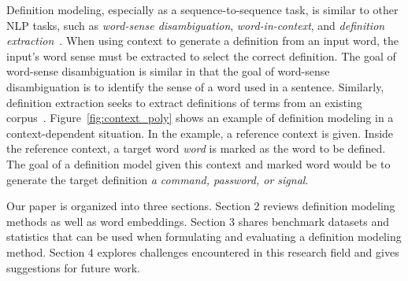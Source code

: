 Definition modeling, especially as a sequence-to-sequence task, is similar to other NLP tasks, such as \textit{word-sense disambiguation}, \textit{word-in-context}, and \textit{definition extraction}~\cite{bevilacqua_generationary_2020, huang_cdm_2021}. When using context to generate a definition from an input word, the input's word sense must be extracted to select the correct definition. The goal of word-sense disambiguation is similar in that the goal of word-sense disambiguation is to identify the sense of a word used in a sentence. Similarly, definition extraction seeks to extract definitions of terms from an existing corpus~\cite{huang_cdm_2021}. Figure~\ref{fig:context_poly} shows an example of definition modeling in a context-dependent situation. In the example, a reference context is given. Inside the reference context, a target word
\textit{word} is marked as the word to be defined. The goal of a definition model given this context and marked word would be to generate the target definition \textit{a command, password, or signal}.

Our paper is organized into three sections. Section 2 reviews definition modeling methods as well as word embeddings. Section 3 shares benchmark datasets
and statistics that can be used when formulating and evaluating a definition modeling method. Section 4 explores challenges encountered in this research field and gives suggestions for future work.
